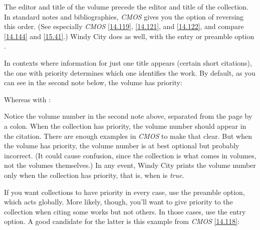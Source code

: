 \documentclass[11pt,letterpaper,oneside]{article}
\begin{document}
\begin{citebib}
\item \cite{armstrong2014}
\end{citebib}

\noindent The editor and title of the volume precede the editor and
title of the collection. In standard notes and bibliographies,
\textit{CMOS} gives you the option of reversing this order. (See
especially \textit{CMOS} \ref{14.119}, \ref{14.121}, and \ref{14.122},
and compare \ref{14.144} and \ref{15.41}.) Windy City does as well,
with the entry or preamble option .

\begin{citebib}
\item \cite{armstrong2014}
\end{citebib}

In contexts where information for just one title appears (certain
short citations), the one with priority determines which one
identifies the work. By default, as you can see in the second note
below, the volume has priority:

\begin{citeonly}
\item \cite{armstrong2014}
\item \cite[45]{armstrong2014}
\end{citeonly}

\noindent Whereas with :

\begin{citeonly}
\item \cite{armstrong2014}
\item \cite[45]{armstrong2014}
\end{citeonly}

Notice the volume number in the second note above, separated from the
page by a colon. When the collection has priority, the volume number
should appear in the citation. There are enough examples in
\textit{CMOS} to make that clear. But when the volume has priority,
the volume number is at best optional but probably incorrect. (It
could cause confusion, since the collection is what comes in volumes,
not the volumes themselves.) In any event, Windy City prints the
volume number only when the collection has priority, that is, when
 is \textit{true}.

If you want collections to have priority in every case, use the
 preamble option, which acts globally. More likely,
though, you'll want to give priority to the collection when citing
some works but not others. In those cases, use the  entry
option. A good candidate for the latter is this example from
\textit{CMOS} \ref{14.118}:
\end{document}

